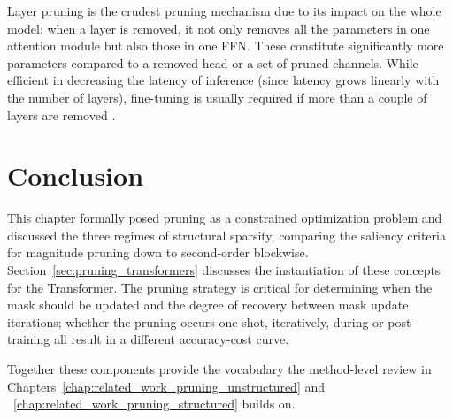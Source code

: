 Layer pruning is the crudest pruning mechanism due to its impact on the whole model: when a layer is removed, it not only removes all the parameters in one attention module but also those in one FFN. These constitute significantly more parameters compared to a removed head or a set of pruned channels. While efficient in decreasing the latency of inference (since latency grows linearly with the number of layers), fine-tuning is usually required if more than a couple of layers are removed \cite{kurtic2023ziplm}.

\section{Conclusion}
\label{sec:pruning_chapter_conclusion}

This chapter formally posed pruning as a constrained optimization problem and discussed the three regimes of structural sparsity, comparing the saliency criteria for magnitude pruning down to second-order blockwise. Section~\ref{sec:pruning_transformers} discusses the instantiation of these concepts for the Transformer. The pruning strategy is critical for determining when the mask should be updated and the degree of recovery between mask update iterations; whether the pruning occurs one-shot, iteratively, during or post-training all result in a different accuracy-cost curve.

Together these components provide the vocabulary the method-level review in
Chapters~\ref{chap:related_work_pruning_unstructured} and ~\ref{chap:related_work_pruning_structured}
builds on.